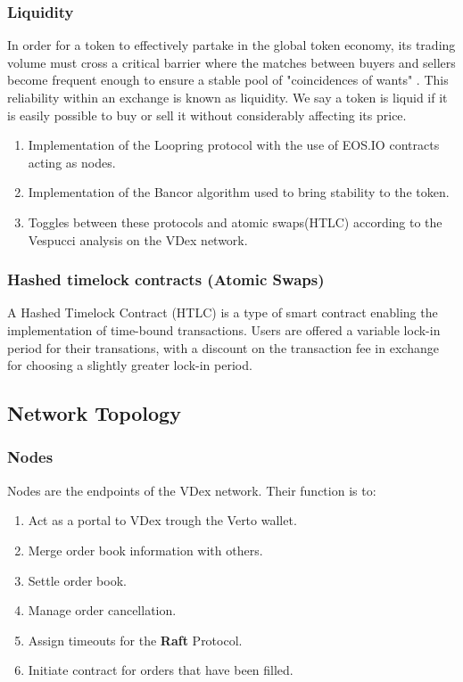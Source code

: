 \documentclass[]{article}
\begin{document}
	
	\subsubsection{Liquidity}
	In order for a token to effectively partake in the global token
	economy, its trading volume must cross a critical barrier where
	the matches between buyers and sellers become frequent enough to ensure a stable pool of "coincidences of wants" \cite{10}. 
	This reliability within an exchange is known as liquidity. We say a token is liquid if it is easily possible to buy or sell it without considerably affecting its price.

	
	\begin{enumerate} 
		\item Implementation of the Loopring protocol with the use of EOS.IO contracts acting as nodes.\cite{7}
		\item Implementation of the Bancor algorithm used to bring stability to the token.\cite{10}
		\item Toggles between these protocols and atomic swaps(HTLC) according to the Vespucci analysis on the VDex network.
		\end{enumerate}
	
	\subsubsection{Hashed timelock contracts (Atomic Swaps)}
	A Hashed Timelock Contract (HTLC)\cite{22} is a type of smart contract enabling the implementation of time-bound transactions.
	Users are offered a variable lock-in period for their transations, 
	with a discount on the transaction fee in exchange for choosing a slightly greater lock-in period.
	
	\subsection{Network Topology}
	\subsubsection{Nodes}
	Nodes are the endpoints of the VDex network.
	Their function is to:\
	\begin{enumerate}
		\item Act as a portal to VDex trough the Verto wallet.
		\item Merge order book information with others.
		\item Settle order book.\
		\item Manage order cancellation.\
		\item Assign timeouts for the \textbf{Raft} Protocol.\
		\item Initiate contract for orders that have been filled.
	\end{enumerate}
\end{document}
